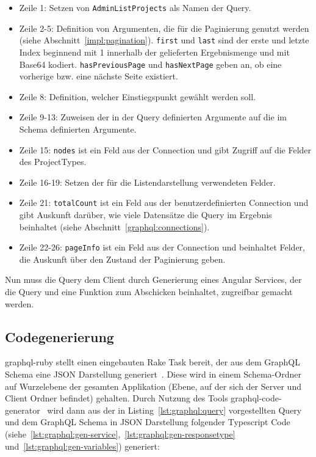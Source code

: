 \begin{itemize}
	\setlength\itemsep{-1em}
	\item Zeile 1: Setzen von \texttt{AdminListProjects} als Namen der Query.
	\item Zeile 2-5: Definition von Argumenten, die für die Paginierung genutzt werden (siehe Abschnitt~\ref{impl:pagination}). \texttt{first} und \texttt{last} sind der erste und letzte Index beginnend mit 1 innerhalb der gelieferten Ergebnismenge und mit Base64 kodiert. \texttt{hasPreviousPage} und \texttt{hasNextPage} geben an, ob eine vorherige bzw. eine nächste Seite existiert.
	\item Zeile 8: Definition, welcher Einstiegspunkt gewählt werden soll.
	\item Zeile 9-13: Zuweisen der in der Query definierten Argumente auf die im Schema definierten Argumente.
	\item Zeile 15: \texttt{nodes} ist ein Feld aus der Connection und gibt Zugriff auf die Felder des ProjectTypes.
	\item Zeile 16-19: Setzen der für die Listendarstellung verwendeten Felder.
	\item Zeile 21: \texttt{totalCount} ist ein Feld aus der benutzerdefinierten Connection und gibt Auskunft darüber, wie viele Datensätze die Query im Ergebnis beinhaltet (siehe Abschnitt~\ref{graphql:connections}).
	\item Zeile 22-26: \texttt{pageInfo} ist ein Feld aus der Connection und beinhaltet Felder, die Auskunft über den Zustand der Paginierung geben.
\end{itemize}

Nun muss die Query dem Client durch Generierung eines Angular Services, der die Query und eine Funktion zum Abschicken beinhaltet, zugreifbar gemacht werden.

\subsection{Codegenerierung}
\label{impl:graphql:generation}
graphql-ruby stellt einen eingebauten Rake Task bereit, der aus dem GraphQL Schema eine JSON Darstellung generiert~\cite{graphql-rake-task}. Diese wird in einem Schema-Ordner auf Wurzelebene der gesamten Applikation (Ebene, auf der sich der Server und Client Ordner befindet) gehalten.
Durch Nutzung des Tools graphql-code-generator~\cite{graphql-code-generator} wird dann aus der in Listing~\ref{lst:graphql:query} vorgestellten Query und dem GraphQL Schema in JSON Darstellung folgender Typescript Code (siehe~\ref{lst:graphql:gen-service},~\ref{lst:graphql:gen-responsetype} und~\ref{lst:graphql:gen-variables}) generiert:

